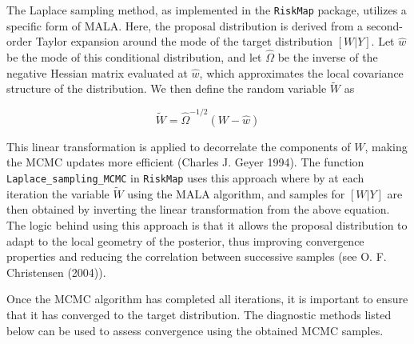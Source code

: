 \documentclass[
  letterpaper,
]{krantz}
\begin{document}
The Laplace sampling method, as implemented in the \texttt{RiskMap}
package, utilizes a specific form of MALA. Here, the proposal
distribution is derived from a second-order Taylor expansion around the
mode of the target distribution \([W | Y]\). Let \(\hat{w}\) be the mode
of this conditional distribution, and let \(\hat{\Omega}\) be the
inverse of the negative Hessian matrix evaluated at \(\hat{w}\), which
approximates the local covariance structure of the distribution. We then
define the random variable \(\tilde{W}\) as

\[
\tilde{W} = \hat{\Omega}^{-1/2} (W - \hat{w})
\]

This linear transformation is applied to decorrelate the components of
\(W\), making the MCMC updates more efficient (Charles J. Geyer 1994).
The function \texttt{Laplace\_sampling\_MCMC} in \texttt{RiskMap} uses
this approach where by at each iteration the variable \(\tilde{W}\)
using the MALA algorithm, and samples for \([W | Y]\) are then obtained
by inverting the linear transformation from the above equation. The
logic behind using this approach is that it allows the proposal
distribution to adapt to the local geometry of the posterior, thus
improving convergence properties and reducing the correlation between
successive samples (see O. F. Christensen (2004)).

Once the MCMC algorithm has completed all iterations, it is important to
ensure that it has converged to the target distribution. The diagnostic
methods listed below can be used to assess convergence using the
obtained MCMC samples.
\end{document}
